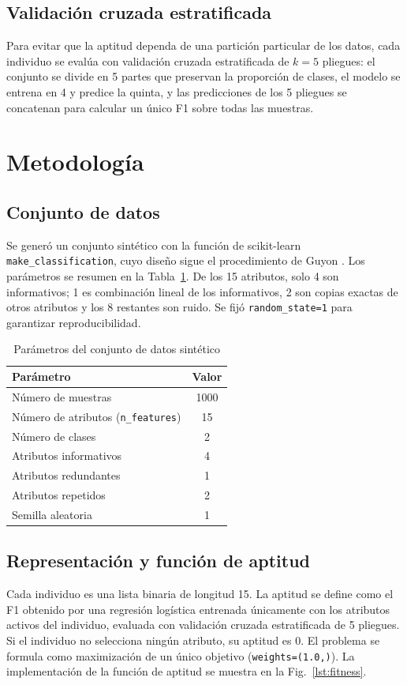 \documentclass[conference]{IEEEtran}
\begin{document}
\subsection{Validación cruzada estratificada}
Para evitar que la aptitud dependa de una partición particular de los datos, cada individuo se evalúa con validación cruzada estratificada de $k=5$ pliegues: el conjunto se divide en 5 partes que preservan la proporción de clases, el modelo se entrena en 4 y predice la quinta, y las predicciones de los 5 pliegues se concatenan para calcular un único F1 sobre todas las muestras.

\section{Metodología}\label{sec:metodo}

\subsection{Conjunto de datos}
Se generó un conjunto sintético con la función de scikit-learn \texttt{make\_classification}, cuyo diseño sigue el procedimiento de Guyon \cite{guyon2003}. Los parámetros se resumen en la Tabla~\ref{tab:dataset}. De los 15 atributos, solo 4 son informativos; 1 es combinación lineal de los informativos, 2 son copias exactas de otros atributos y los 8 restantes son ruido. Se fijó \texttt{random\_state=1} para garantizar reproducibilidad.

\begin{table}[htbp]
\caption{Parámetros del conjunto de datos sintético}
\label{tab:dataset}
\centering
\begin{tabular}{lc}
\toprule
\textbf{Parámetro} & \textbf{Valor} \\
\midrule
Número de muestras & 1000 \\
Número de atributos (\texttt{n\_features}) & 15 \\
Número de clases & 2 \\
Atributos informativos & 4 \\
Atributos redundantes & 1 \\
Atributos repetidos & 2 \\
Semilla aleatoria & 1 \\
\bottomrule
\end{tabular}
\end{table}

\subsection{Representación y función de aptitud}
Cada individuo es una lista binaria de longitud 15. La aptitud se define como el F1 obtenido por una regresión logística entrenada únicamente con los atributos activos del individuo, evaluada con validación cruzada estratificada de 5 pliegues. Si el individuo no selecciona ningún atributo, su aptitud es 0. El problema se formula como maximización de un único objetivo (\texttt{weights=(1.0,)}). La implementación de la función de aptitud se muestra en la Fig.~\ref{lst:fitness}.
\end{document}

